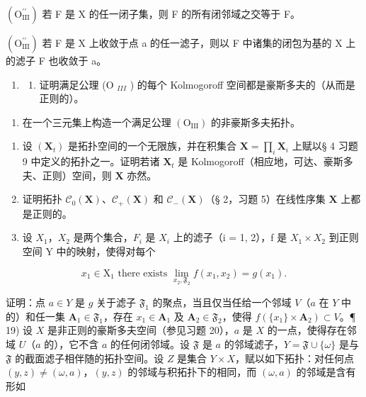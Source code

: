 \((\mathrm{O}_{\mathrm{III}}^{\prime\prime})\) 若 F 是 X 的任一闭子集，则 F 的所有闭邻域之交等于 F。

\((\mathrm{O}_{\mathrm{III}}^{\prime\prime})\) 若 F 是 X 上收敛于点 a 的任一滤子，则以 F 中诸集的闭包为基的 X 上的滤子 F 也收敛于 a。

\begin{enumerate}
\def\labelenumi{\arabic{enumi})}
\setcounter{enumi}{14}
\tightlist
\item
  \begin{enumerate}
  \def\labelenumii{\alph{enumii})}
  \tightlist
  \item
    证明满足公理 (O \(_{III}\) ) 的每个 Kolmogoroff 空间都是豪斯多夫的（从而是正则的）。
  \end{enumerate}
\end{enumerate}

\begin{enumerate}
\def\labelenumi{\alph{enumi})}
\setcounter{enumi}{1}
\tightlist
\item
  在一个三元集上构造一个满足公理 \((\mathrm{O}_{\mathrm{III}})\) 的非豪斯多夫拓扑。
\end{enumerate}

\begin{enumerate}
\def\labelenumi{\arabic{enumi})}
\setcounter{enumi}{15}
\item
  设 \((\mathbf{X}_t)\) 是拓扑空间的一个无限族，并在积集合 \(\mathbf{X} = \prod_{i} \mathbf{X}_i\) 上赋以§ 4 习题 9 中定义的拓扑之一。证明若诸 \(\mathbf{X}_t\) 是 Kolmogoroff（相应地，可达、豪斯多夫、正则）空间，则 \(\mathbf{X}\) 亦然。
\item
  证明拓扑 \(\mathcal{C}_0(\mathbf{X})\)、\(\mathcal{C}_+(\mathbf{X})\) 和 \(\mathcal{C}_{-}(\mathbf{X})\)（§ 2，习题 5）在线性序集 \(\mathbf{X}\) 上都是正则的。
\item
  设 \(X_{1}\)，\(X_{2}\) 是两个集合，\(F_{i}\) 是 \(X_{i}\) 上的滤子（i = 1, 2），f 是 \(X_{1} \times X_{2}\) 到正则空间 Y 中的映射，使得对每个
\end{enumerate}

\[
x _ {1} \in \mathrm{X} _ {1} \text { there   exists } \lim _ {x _ {2}, \mathfrak {F} _ {2}} f (x _ {1}, x _ {2}) = g (x _ {1}).
\]

证明：点 \(a \in Y\) 是 \(g\) 关于滤子 \(\mathfrak{F}_1\) 的聚点，当且仅当任给一个邻域 \(V\)（\(a\) 在 \(Y\) 中的）和任一集 \(\mathbf{A}_1 \in \mathfrak{F}_1\)，存在 \(x_1 \in \mathbf{A}_1\) 及 \(\mathbf{A}_2 \in \mathfrak{F}_2\)，使得 \(f(\{x_1\} \times \mathbf{A}_2) \subset V\)。¶ 19) 设 \(X\) 是非正则的豪斯多夫空间（参见习题 20），\(a\) 是 \(X\) 的一点，使得存在邻域 \(U\)（\(a\) 的），它不含 \(a\) 的任何闭邻域。设 \(\mathfrak{F}\) 是 \(a\) 的邻域滤子，\(Y = \mathfrak{F} \cup \{\omega\}\) 是与 \(\mathfrak{F}\) 的截面滤子相伴随的拓扑空间。设 \(Z\) 是集合 \(Y \times X\)，赋以如下拓扑：对任何点 \((y, z) \neq (\omega, a)\)，\((y, z)\) 的邻域与积拓扑下的相同，而 \((\omega, a)\) 的邻域是含有形如

